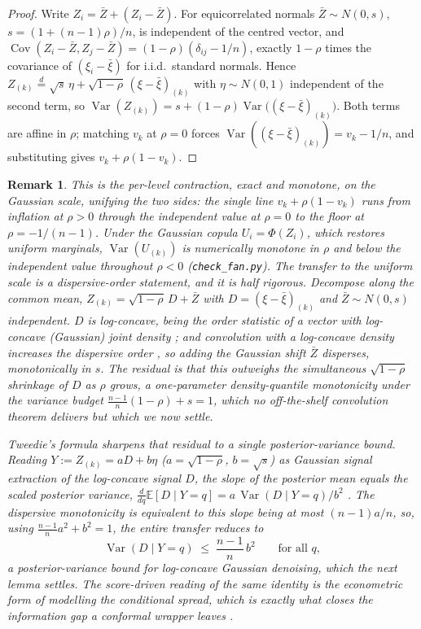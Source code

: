 \documentclass[11pt]{article}
\newtheorem{remark}{Remark}
\begin{document}
\begin{proof}
Write $Z_i=\bar Z+(Z_i-\bar Z)$. For equicorrelated normals $\bar Z\sim N(0,s)$,
$s=(1+(n-1)\rho)/n$, is independent of the centred vector, and
$\operatorname{Cov}(Z_i-\bar Z,Z_j-\bar Z)=(1-\rho)(\delta_{ij}-1/n)$, exactly $1-\rho$ times the
covariance of $(\xi_i-\bar\xi)$ for i.i.d.\ standard normals. Hence
$Z_{(k)}\stackrel{d}{=}\sqrt{s}\,\eta+\sqrt{1-\rho}\,(\xi-\bar\xi)_{(k)}$ with $\eta\sim N(0,1)$
independent of the second term, so
$\operatorname{Var}(Z_{(k)})=s+(1-\rho)\operatorname{Var}\big((\xi-\bar\xi)_{(k)}\big)$. Both terms
are affine in $\rho$; matching $v_k$ at $\rho=0$ forces
$\operatorname{Var}((\xi-\bar\xi)_{(k)})=v_k-1/n$, and substituting gives $v_k+\rho(1-v_k)$.
\end{proof}

\begin{remark}
This is the per-level contraction, exact and monotone, on the Gaussian scale, unifying the two sides:
the single line $v_k+\rho(1-v_k)$ runs from inflation at $\rho>0$ through the independent value at
$\rho=0$ to the floor at $\rho=-1/(n-1)$. Under the Gaussian copula $U_i=\Phi(Z_i)$, which restores
uniform marginals, $\operatorname{Var}(U_{(k)})$ is numerically monotone in $\rho$ and below the
independent value throughout $\rho<0$ (\texttt{check\_fan.py}). The transfer to the uniform scale is
a dispersive-order statement, and it is half rigorous. Decompose along the common mean,
$Z_{(k)}=\sqrt{1-\rho}\,D+\bar Z$ with $D=(\xi-\bar\xi)_{(k)}$ and $\bar Z\sim N(0,s)$ independent.
$D$ is log-concave, being the order statistic of a vector with log-concave (Gaussian) joint density
\citep{prekopa1973}; and convolution with a log-concave density increases the dispersive order
\citep{lewis1981}, so adding the Gaussian shift $\bar Z$ disperses, monotonically in $s$. The residual
is that this outweighs the simultaneous $\sqrt{1-\rho}$ shrinkage of $D$ as $\rho$ grows, a one-parameter
density-quantile monotonicity under the variance budget $\tfrac{n-1}n(1-\rho)+s=1$, which no
off-the-shelf convolution theorem delivers but which we now settle.

Tweedie's formula sharpens that residual to a single posterior-variance bound. Reading
$Y:=Z_{(k)}=aD+b\eta$ ($a=\sqrt{1-\rho}$, $b=\sqrt s$) as Gaussian signal extraction of the
log-concave signal $D$, the slope of the posterior mean equals the scaled posterior variance,
$\frac{d}{dq}\mathbb E[D\mid Y=q]=a\,\operatorname{Var}(D\mid Y=q)/b^2$
\citep{efron2011,hansen2026}. The dispersive monotonicity is equivalent to this slope being at most
$(n-1)a/n$, so, using $\tfrac{n-1}n a^2+b^2=1$, the entire transfer reduces to
\begin{equation}
\operatorname{Var}(D\mid Y=q)\;\le\;\frac{n-1}{n}\,b^2\qquad\text{for all }q,
\end{equation}
a posterior-variance bound for log-concave Gaussian denoising, which the next lemma settles. The
score-driven reading of the same identity \citep{hansen2026} is the econometric form of modelling the
conditional spread, which is exactly what closes the information gap a conformal wrapper leaves
\citep{cotton_marginally}.
\end{remark}
\end{document}
